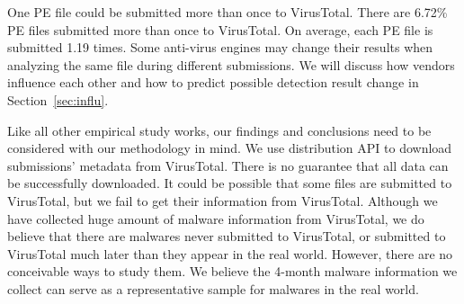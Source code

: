 One PE file could be submitted more than once to VirusTotal. 
There are 6.72\% PE files submitted more than once to VirusTotal. 
On average, each PE file is submitted 1.19 times. 
Some anti-virus engines may change their results when analyzing the same file during different submissions.
We will discuss how vendors influence each other and how to predict possible detection result change in Section~\ref{sec:influ}.

Like all other empirical study works, 
our findings and conclusions need to be considered with our methodology in mind. 
We use distribution API to download submissions' metadata from VirusTotal. 
There is no guarantee that all data can be successfully downloaded. 
It could be possible that some files are submitted to VirusTotal, 
but we fail to get their information from VirusTotal.
Although we have collected huge amount of malware information from VirusTotal,
we do believe that there are malwares never submitted to VirusTotal, 
or submitted to VirusTotal much later than they appear in the real world. 
However, there are no conceivable ways to study them.
We believe the 4-month malware information we collect can serve as a representative sample for malwares in the real world. 
